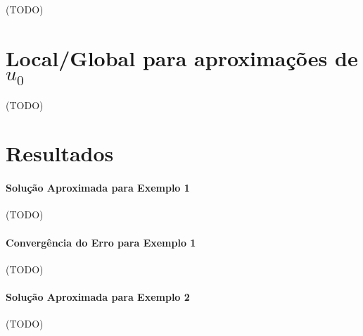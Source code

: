 \documentclass[a4paper]{article}
\begin{document}
(TODO)

\section{Local/Global para aproximações de \texorpdfstring{\(u_0\)}{u0}}
\label{sec:U0}

(TODO)

\newpage
\section{Resultados}

\paragraph{Solução Aproximada para Exemplo 1}

(TODO)

\paragraph{Convergência do Erro para Exemplo 1}

(TODO)

\paragraph{Solução Aproximada para Exemplo 2}

(TODO)
\end{document}
